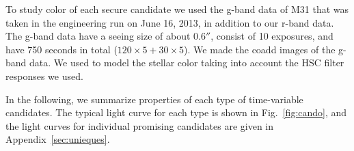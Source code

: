 \documentclass[iop, apj]{emulateapj}
\newcommand{\?}{\stackrel{?}{=}}
\begin{document}
To study color of each secure candidate we used the g-band data of M31 that was taken in the engineering run on June 16, 2013, in addition to our r-band data. The g-band data have a seeing size of about $0.6''$, consist of 10 exposures,  and have 750 seconds in total ($120\times 5 + 30\times 5$). 
We made the coadd images of the g-band data. 
We used \citet{Kurucz:93} to model the stellar color taking into account the HSC filter responses we used. 

In the following, we summarize properties of each type of time-variable candidates. The typical light curve for each type is shown in Fig.~\ref{fig:cando}, and the light curves for individual promising candidates are given in Appendix~\ref{sec:unieques}.  

\end{document}
